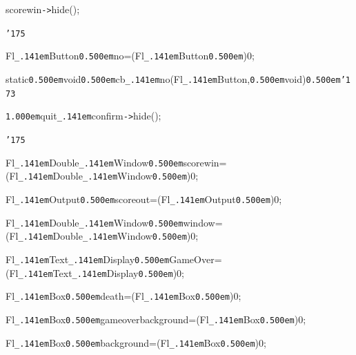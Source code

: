 \documentclass[12pt]{article}
\begin{document}
\noindent
{}scorewin{\tt -}{\tt >}hide();

\noindent
{}{\tt\char'175}

\noindent
{}\hfill

\noindent
{}Fl{\tt\_\kern.141em}Button{\tt\mc \kern0.500em}{\tt *}no=(Fl{\tt\_\kern.141em}Button{\tt\mc \kern0.500em}{\tt *})0;

\noindent
{}\hfill

\noindent
{}static{\tt\mc \kern0.500em}void{\tt\mc \kern0.500em}cb{\tt\_\kern.141em}no(Fl{\tt\_\kern.141em}Button{\tt *},{\tt\mc \kern0.500em}void{\tt *}){\tt\mc \kern0.500em}{\tt\char'173}

\noindent
{}{\tt\mc \kern1.000em}quit{\tt\_\kern.141em}confirm{\tt -}{\tt >}hide();

\noindent
{}{\tt\char'175}

\noindent
{}\hfill

\noindent
{}Fl{\tt\_\kern.141em}Double{\tt\_\kern.141em}Window{\tt\mc \kern0.500em}{\tt *}scorewin=(Fl{\tt\_\kern.141em}Double{\tt\_\kern.141em}Window{\tt\mc \kern0.500em}{\tt *})0;

\noindent
{}\hfill

\noindent
{}Fl{\tt\_\kern.141em}Output{\tt\mc \kern0.500em}{\tt *}scoreout=(Fl{\tt\_\kern.141em}Output{\tt\mc \kern0.500em}{\tt *})0;

\noindent
{}\hfill

\noindent
{}Fl{\tt\_\kern.141em}Double{\tt\_\kern.141em}Window{\tt\mc \kern0.500em}{\tt *}window=(Fl{\tt\_\kern.141em}Double{\tt\_\kern.141em}Window{\tt\mc \kern0.500em}{\tt *})0;

\noindent
{}\hfill

\noindent
{}Fl{\tt\_\kern.141em}Text{\tt\_\kern.141em}Display{\tt\mc \kern0.500em}{\tt *}GameOver=(Fl{\tt\_\kern.141em}Text{\tt\_\kern.141em}Display{\tt\mc \kern0.500em}{\tt *})0;

\noindent
{}\hfill

\noindent
{}Fl{\tt\_\kern.141em}Box{\tt\mc \kern0.500em}{\tt *}death=(Fl{\tt\_\kern.141em}Box{\tt\mc \kern0.500em}{\tt *})0;

\noindent
{}\hfill

\noindent
{}Fl{\tt\_\kern.141em}Box{\tt\mc \kern0.500em}{\tt *}gameoverbackground=(Fl{\tt\_\kern.141em}Box{\tt\mc \kern0.500em}{\tt *})0;

\noindent
{}\hfill

\noindent
{}Fl{\tt\_\kern.141em}Box{\tt\mc \kern0.500em}{\tt *}background=(Fl{\tt\_\kern.141em}Box{\tt\mc \kern0.500em}{\tt *})0;
\end{document}
